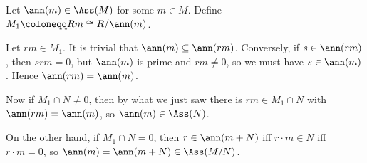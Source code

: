 Let $\ann(m) \in \Ass(M)$ for some $m \in M$. Define
$M_1\coloneqq Rm \cong R/\ann(m)$.

Let $rm \in M_1.$
It is trivial that $\ann(m) \subseteq \ann(rm)$. Conversely, if
$s \in \ann(rm)$, then $srm = 0$, but $\ann(m)$ is prime and
$rm\neq 0$, so we must have $s \in \ann(m)$. Hence $\ann(rm) = \ann(m)$.

Now if $M_1\cap N \neq 0$, then by what we just saw there is $rm \in M_1\cap N$
with $\ann(rm) = \ann(m)$, so $\ann(m) \in \Ass(N)$.

On the other hand, if $M_1\cap N = 0$, then $r \in\ann(m + N)$ iff
$r\cdot m \in N$ iff $r\cdot m = 0$, so $\ann(m) = \ann(m+N) \in \Ass(M/N)$.
